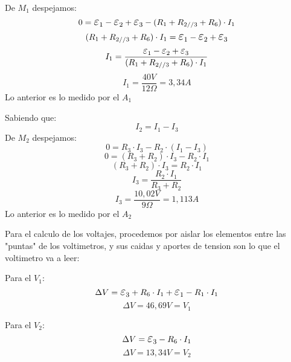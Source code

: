 \documentclass[12pt]{report}
\newcommand {\LEpsilon}{\mathlarger{\mathlarger{\varepsilon}}}
\begin{document}
\noindent
\begin{minipage}[t]{0.5\textwidth}
  \centering
  De $M_1$ despejamos:
  $$0 = \LEpsilon_1 - \LEpsilon_2 + \LEpsilon_3 - (R_1 + R_{2//3} + R_6) \cdot I_1$$
  $$(R_1 + R_{2//3} + R_6) \cdot I_1 = \LEpsilon_1 - \LEpsilon_2 + \LEpsilon_3$$
  $$I_1 = \frac{\LEpsilon_1 - \LEpsilon_2 + \LEpsilon_3}{(R_1 + R_{2//3} + R_6) \cdot I_1}$$
  $$I_1 = \frac{40 V}{12 \Omega} = 3,\!34 A$$
  Lo anterior es lo medido por el $A_1$
\end{minipage}
\begin{minipage}[t]{0.5\textwidth}
  \centering
  Sabiendo que:
  $$I_2 = I_1 - I_3$$
  De $M_2$ despejamos:
  $$0 = R_3 \cdot I_3 - R_2 \cdot (I_1 - I_3)$$
  $$0 = (R_3 + R_2) \cdot I_3 - R_2 \cdot I_1$$
  $$(R_3 + R_2) \cdot I_3 = R_2 \cdot I_1$$
  $$I_3 = \frac{R_2 \cdot I_1}{R_3 + R_2}$$
  $$I_3 = \frac{10,\!02 V}{9 \Omega} = 1,\!113 A$$
  Lo anterior es lo medido por el $A_2$
\end{minipage}

\newpage

Para el calculo de los voltajes, procedemos por aislar los elementos entre las "puntas" de los voltimetros, y sus caidas y aportes de tension son lo que el voltimetro va a leer:\\

\noindent
\begin{minipage}[t]{0.5\textwidth}
  \centering
  Para el $V_1$:
  $$\Delta V = \LEpsilon_3+R_6 \cdot I_1 + \LEpsilon_1 - R_1 \cdot I_1$$
  $$\Delta V = 46,\!69 V = V_1$$
\end{minipage}
\begin{minipage}[t]{0.5\textwidth}
  \centering
  Para el $V_2$:
  $$\Delta V = \LEpsilon_3 - R_6 \cdot I_1$$
  $$\Delta V = 13,\!34 V = V_2$$
\end{minipage}
\end{document}
